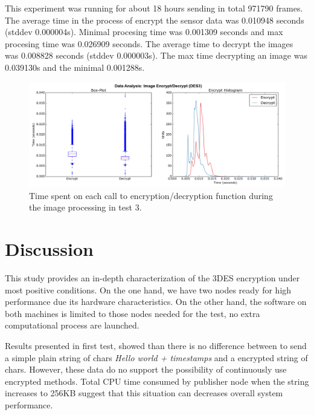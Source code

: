 \documentclass[journal,twoside]{JoPhA}
\begin{document}
This experiment was running for about 18 hours sending in total 971790 frames. The average time in the process of encrypt the sensor data was 0.010948 seconds (stddev 0.000004s).
Minimal procesing time was 0.001309 seconds and max procesing time was 0.026909 seconds. 
The average time to decrypt the images was 0.008828 seconds (stddev 0.000003s).
The max time decrypting an image was 0.039130s and the minimal 0.001288s. 





\begin{figure}[ht!]
	\centering
	\includegraphics[width=.99\textwidth]{Outline_images_encryption_decrytiontime2.png}
	\caption{Time spent on each call to encryption/decryption function during the image processing in test 3.}
	\label{fig:images_encryption}
\end{figure}


\section{Discussion}

This  study  provides  an  in-depth  characterization  of  the  3DES encryption under most positive conditions. On the one hand, we have two nodes ready for high performance due its  hardware characteristics.  On the other hand, the software on both machines is limited to those nodes needed for the test, no extra computational process are launched.

Results presented in first test, showed than there is no difference between to send a simple plain string of chars {\em Hello world + timestamps}  and a encrypted string of chars. 
However, these data do no support the possibility of continuously  use encrypted methods. Total CPU time consumed by publisher node when the string increases to 256KB suggest that this situation can decreases overall system performance.    
\end{document}
